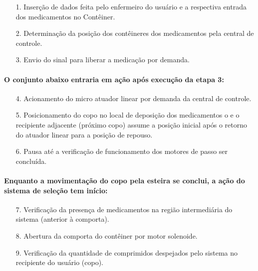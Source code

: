 \begin{enumerate}
    \item[1.] Inserção de dados feita pelo enfermeiro do usuário e a respectiva entrada dos medicamentos no Contêiner.
    \item[2.] Determinação da posição dos contêineres dos medicamentos pela central de controle.
    \item[3.] Envio do sinal para liberar a medicação por demanda.
    \end{enumerate} 
   
\paragraph*{O conjunto abaixo entraria em ação após execução da etapa 3:}

\begin{enumerate}
    \item [4.] Acionamento do micro atuador linear por demanda da central de controle.
    \item [5.] Posicionamento do copo no local de deposição dos medicamentos o e o recipiente adjacente (próximo copo) assume a posição inicial após o retorno do atuador linear para a posição de repouso.
    \item [6.] Pausa até a verificação de funcionamento dos motores de passo ser concluída.
\end{enumerate}
    
\paragraph*{Enquanto a movimentação do copo pela esteira se conclui, a ação do sistema de seleção tem início:}

\begin{enumerate}
    \item[7.] Verificação da presença de medicamentos na região intermediária do sistema (anterior à comporta).
    \item[8.] Abertura da comporta do contêiner por motor solenoide.
    \item[9.] Verificação da quantidade de comprimidos despejados pelo sistema no recipiente do usuário (copo).
\end{enumerate}
   
